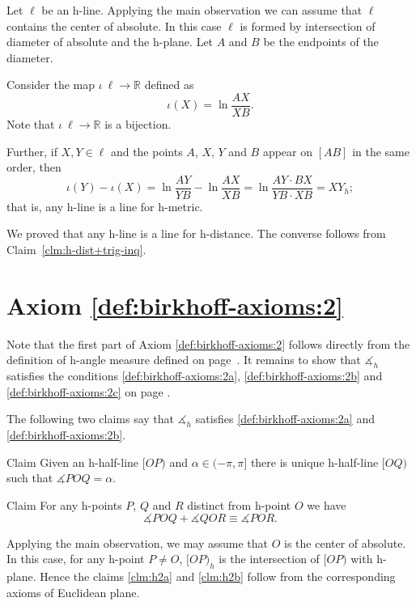Let $\ell$ be an h-line.
Applying the main observation we can assume that $\ell$ contains the center of absolute.
In this case $\ell$ is formed by intersection of diameter of absolute and the h-plane.
Let $A$ and $B$ be the endpoints of the diameter.

Consider the map $\iota\:\ell\to \mathbb{R}$ defined as
$$\iota(X)=\ln \frac{AX}{XB}.$$
Note that $\iota\:\ell\to \mathbb{R}$ is a bijection.

Further, if $X,Y\in \ell$ and the points $A$, $X$, $Y$ and $B$ appear on $[AB]$ in the same order, then
\[\iota(Y)-\iota(X)=\ln \frac{AY}{YB}-\ln \frac{AX}{XB}=\ln \frac{AY\cdot BX}{YB\cdot XB}=XY_h;\]
that is, any h-line is a line for h-metric.

We proved that any h-line is a line for h-distance.
The converse follows from Claim~\ref{clm:h-dist+trig-inq}.
\qeds


\section*{Axiom \ref{def:birkhoff-axioms:2}}

Note that the first part of Axiom \ref{def:birkhoff-axioms:2} follows directly from the definition of h-angle measure defined on page~\pageref{h-angle measure}.
It remains to show that $\measuredangle_h$ satisfies the conditions \ref{def:birkhoff-axioms:2a}, \ref{def:birkhoff-axioms:2b} and \ref{def:birkhoff-axioms:2c} on page \pageref{def:birkhoff-axioms:2b}.

The following two claims say that
$\measuredangle_h$ satisfies
 \ref{def:birkhoff-axioms:2a} and \ref{def:birkhoff-axioms:2b}.

\begin{thm}{Claim}\label{clm:h2a}
Given an h-half-line $[O P)$ and $\alpha\in(-\pi,\pi]$ there is unique  h-half-line $[O Q)$ such that $\measuredangle P O Q= \alpha$.
\end{thm}

\begin{thm}{Claim}\label{clm:h2b}
For any h-points $P$, $Q$ and $R$ distinct from h-point $O$ we have
$$\measuredangle P O Q+\measuredangle Q O R
\equiv\measuredangle P O R.$$

\end{thm}

Applying the main observation, 
we may assume that $O$ is the center of absolute.
In this case, for any h-point $P\ne O$,
$[OP)_h$ is the intersection of $[OP)$ with h-plane.
Hence the claims \ref{clm:h2a} and \ref{clm:h2b} 
follow from the corresponding axioms of Euclidean plane.
\qeds

